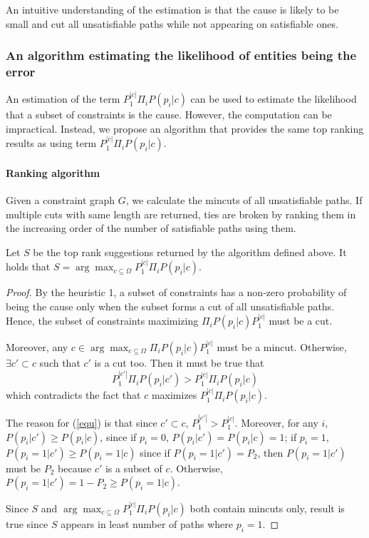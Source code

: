 An intuitive understanding of the estimation is that the cause is likely to be
small and cut all unsatisfiable paths while not appearing on satisfiable ones.

\subsubsection{An algorithm estimating the likelihood of entities being the error}    

An estimation of the term $P_1^{|c|} \Pi_i P(p_i|c)$ can be used to estimate
the likelihood that a subset of constraints is the cause. However, the
computation can be impractical. Instead, we propose an algorithm that provides
the same top ranking results as using term $P_1^{|c|} \Pi_i P(p_i|c)$.

\paragraph{Ranking algorithm}

Given a constraint graph $G$, we calculate the mincuts of all unsatisfiable
paths. If multiple cuts with same length are returned, ties are broken by
ranking them in the increasing order of the number of satisfiable paths using
them.

\begin{Theorem}
Let $S$ be the top rank suggestions returned by the algorithm defined above.
It holds that $S = \arg\max_{c\subseteq \Omega}P_1^{|c|} \Pi_i P(p_i|c)$.  
\end{Theorem}

\begin{proof}
By the heuristic 1, a subset of constraints has a non-zero probability of being
the cause only when the subset forms a cut of all unsatisfiable paths. Hence,
the subset of constraints maximizing $\Pi_i P(p_i|c) P_1^{|c|}$ must be a cut.

Moreover, any $c\in \arg\max_{c\subseteq \Omega}\Pi_i P(p_i|c) P_1^{|c|}$ must
be a mincut. Otherwise, $\exists c'\subset c$ such that $c'$ is a cut too. Then
it must be true that 
\begin{equation}
\label{equ}
P_1^{|c'|} \Pi_i P(p_i|c') > P_1^{|c|} \Pi_i P(p_i|c)
\end{equation}
which contradicts the fact that $c$ maximizes $P_1^{|c|} \Pi_i P(p_i|c)$.

The reason for (\ref{equ}) is that since $c'\subset c$, $P_1^{|c'|}>
P_1^{|c|}$. Moreover, for any $i$,  $P(p_i|c') \geq P(p_i|c)$, since if
$p_i=0$, $P(p_i|c')=P(p_i|c)=1$; if $p_i=1$, $P(p_i=1|c')\geq P(p_i=1|c)$ since
if $P(p_i=1|c')=P_2$, then $P(p_i=1|c')$ must be $P_2$ because $c'$ is a subset
of $c$.  Otherwise, $P(p_i=1|c')=1-P_2\geq P(p_i=1|c)$.

Since $S$ and $\arg\max_{c\subseteq \Omega}P_1^{|c|} \Pi_i P(p_i|c)$ both
contain mincuts only, result is true since $S$ appears in least number of paths
where $p_i=1$.
\end{proof}

